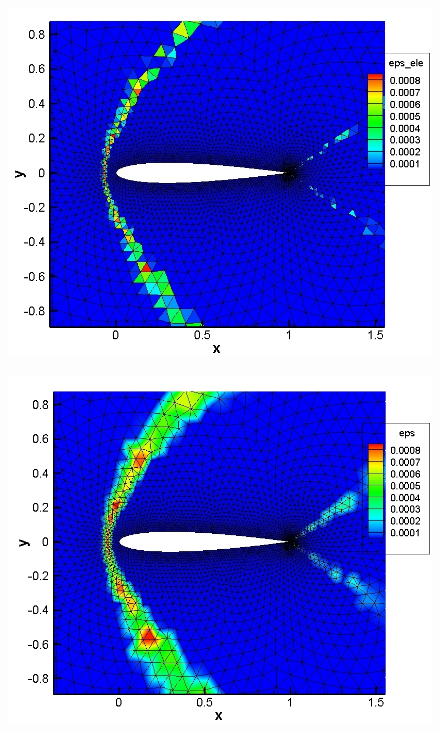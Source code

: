 \begin{figure}
\centering
\begin{minipage}[t]{.55\textwidth}
  \centering
  \includegraphics[width=.85\linewidth]{./figures/M1pt6-inv-av-ele-mesh}
  \label{fig:AV-ele}
\end{minipage}%
\begin{minipage}[t]{.55\textwidth}
  \centering
  \includegraphics[width=.85\linewidth]{./figures/M1pt6-inv-av-mesh}
  \label{fig:AV-cont}
\end{minipage}
\end{figure} 


